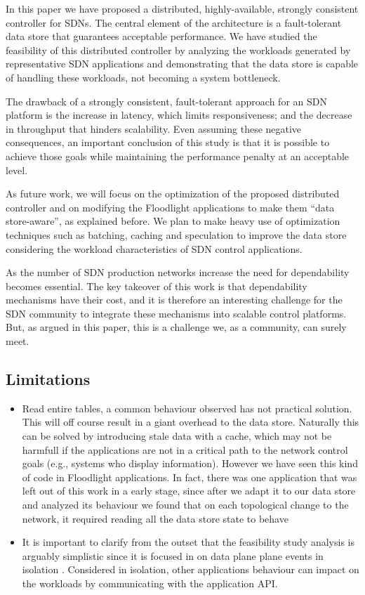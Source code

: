In this paper we have proposed a distributed, highly-available, strongly consistent controller for SDNs.
The central element of the architecture is a fault-tolerant data store that guarantees acceptable performance.
We have studied the feasibility of this distributed controller by analyzing  the workloads generated by representative SDN applications and demonstrating that the data store is capable of handling these workloads, not becoming a system bottleneck.

The drawback of a strongly consistent, fault-tolerant approach for an SDN platform is the increase in latency, which limits responsiveness; and the decrease in throughput that hinders scalability.
Even assuming these negative consequences, an important conclusion of this study is that it is possible to achieve those goals while maintaining the performance penalty at an acceptable level.

As future work, we will focus on the optimization of the proposed distributed controller and on modifying the Floodlight applications to make them ``data store-aware'', as explained before. 
We plan to make heavy use of optimization techniques such as batching, caching and speculation to improve the data store considering the workload characteristics of SDN control applications.

As the number of SDN production networks increase the need for dependability becomes essential. The key takeover of this work is that dependability mechanisms have their cost, and it is therefore an interesting challenge for the SDN community to integrate these mechanisms into scalable control platforms. But, as argued in this paper, this is a challenge we, as a community, can surely meet.\\


\subsection{Limitations}
\begin{itemize}
\item Read entire tables, a common behaviour observed has not practical solution.  This will off course result in a giant overhead to the data store. Naturally this can be solved by introducing stale data with a cache, which may not be harmfull if the applications are not in a critical path to the network control goals (e.g., systems who display information). However we have seen this kind of code in Floodlight applications. In fact, there was one application that was left out of this work in a early stage, since after we adapt it to our data store and analyzed its behaviour we found that on each topological change to the network, it required reading all the data store state to behave 
\item It is important to clarify from the outset that the feasibility study analysis is arguably simplistic since it is focused in on data plane plane events in isolation . Considered in isolation,
other applications behaviour can impact on the workloads  by communicating with the application API.
\end{itemize}

